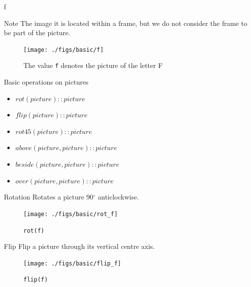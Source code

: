 \documentclass{beamer}
\begin{document}
    \begin{frame}{f}
        \begin{alertblock}{Note}
        The image it is located within a frame, but we do not consider the frame to be part of the picture.
        \end{alertblock}

        \begin{figure}
            \centering
            \texttt{[image: ./figs/basic/f]}
            \caption{\footnotesize The value \texttt{f} denotes the picture of the letter F}
            \label{fig:f}
        \end{figure}

    \end{frame}

    \begin{frame}{Basic operations on pictures}

        \begin{itemize}
            \item $rot(picture) :: picture$
            \item $flip(picture) :: picture$
            \item $rot45(picture) :: picture$
            \item $above(picture, picture) :: picture$
            \item $beside(picture, picture) :: picture$
            \item $over(picture, picture) :: picture$
        \end{itemize}

    \end{frame}

    \begin{frame}{Rotation}
        Rotates a picture 90$^{\circ}$ anticlockwise.

        \begin{figure}
            \centering
            \texttt{[image: ./figs/basic/rot\_f]}
            \caption{\texttt{rot(f)}}
            \label{fig:rot_f}
        \end{figure}
    \end{frame}

    \begin{frame}{Flip}
    	Flip a picture through its vertical centre axis.

        \begin{figure}
            \centering
            \texttt{[image: ./figs/basic/flip\_f]}
            \caption{\texttt{flip(f)}}
            \label{fig:flip_f}
        \end{figure}
    \end{frame}
\end{document}
